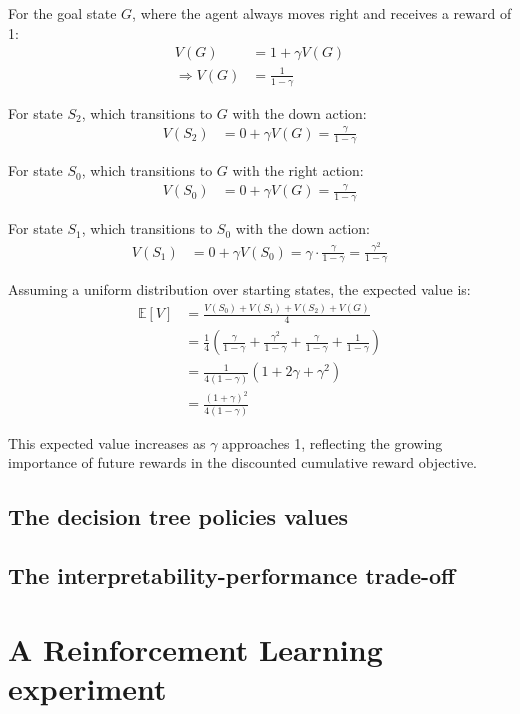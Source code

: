 For the goal state $G$, where the agent always moves right and receives a reward of 1:
\begin{align}
V(G) &= 1 + \gamma V(G) \\
\Rightarrow V(G) &= \frac{1}{1-\gamma}
\end{align}

For state $S_2$, which transitions to $G$ with the down action:
\begin{align}
V(S_2) &= 0 + \gamma V(G) = \frac{\gamma}{1-\gamma}
\end{align}

For state $S_0$, which transitions to $G$ with the right action:
\begin{align}
V(S_0) &= 0 + \gamma V(G) = \frac{\gamma}{1-\gamma}
\end{align}

For state $S_1$, which transitions to $S_0$ with the down action:
\begin{align}
V(S_1) &= 0 + \gamma V(S_0) = \gamma \cdot \frac{\gamma}{1-\gamma} = \frac{\gamma^2}{1-\gamma}
\end{align}

Assuming a uniform distribution over starting states, the expected value is:
\begin{align}
\mathbb{E}[V] &= \frac{V(S_0) + V(S_1) + V(S_2) + V(G)}{4} \\
&= \frac{1}{4} \left( \frac{\gamma}{1-\gamma} + \frac{\gamma^2}{1-\gamma} + \frac{\gamma}{1-\gamma} + \frac{1}{1-\gamma} \right) \\
&= \frac{1}{4(1-\gamma)} \left( 1 + 2\gamma + \gamma^2 \right) \\
&= \frac{{(1 + \gamma)}^2}{4(1-\gamma)}
\end{align}

This expected value increases as $\gamma$ approaches 1, reflecting the growing importance of future rewards in the discounted cumulative reward objective.

\subsection{The decision tree policies values}
\subsection{The interpretability-performance trade-off}

\section{A Reinforcement Learning experiment}
